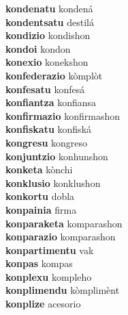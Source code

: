 \textbf{kondenatu } kondená \\
\textbf{kondentsatu } destilá \\
\textbf{kondizio } kondishon \\
\textbf{kondoi } kondon \\
\textbf{konexio } konekshon \\
\textbf{konfederazio } kòmplòt \\
\textbf{konfesatu } konfesá \\
\textbf{konfiantza } konfiansa \\
\textbf{konfirmazio } konfirmashon \\
\textbf{konfiskatu } konfiská \\
\textbf{kongresu } kongreso \\
\textbf{konjuntzio } konhunshon \\
\textbf{konketa } kònchi \\
\textbf{konklusio } konklushon \\
\textbf{konkortu } dobla \\
\textbf{konpainia } firma \\
\textbf{konparaketa } komparashon \\
\textbf{konparazio } komparashon \\
\textbf{konpartimentu } vak \\
\textbf{konpas } kompas \\
\textbf{konplexu } kompleho \\
\textbf{konplimendu } kòmplimènt \\
\textbf{konplize } acesorio \\
